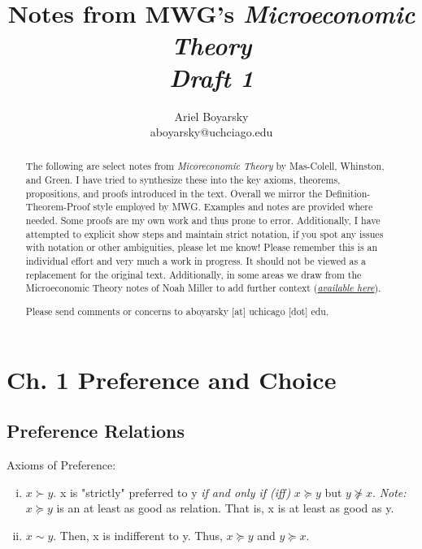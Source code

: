 \documentclass[12pt]{article}
\begin{document}
\title{Notes from MWG's \emph{Microeconomic Theory \\ Draft 1}} 
\author{Ariel Boyarsky\\ aboyarsky@uchciago.edu} 
\maketitle


\begin{abstract}
The following are select notes from \emph{Micoreconomic Theory} by Mas-Colell, Whinston, and Green. I have tried to synthesize these into the key axioms, theorems, propositions, and proofs introduced in the text. Overall we mirror the Definition-Theorem-Proof style employed by MWG. Examples and notes are provided where needed. Some proofs are my own work and thus prone to error. Additionally, I have attempted to explicit show steps and maintain strict notation, if you spot any issues with notation or other ambiguities, please let me know! Please remember this is an individual effort and very much a work in progress. It should not be viewed as a replacement for the original text. Additionally, in some areas we draw from the Microeconomic Theory notes of Noah Miller to add further context (\href{https://business.illinois.edu/nmiller/documents/notes/firsthalf.pdf}{\emph{available here}}).

Please send comments or concerns to aboyarsky [at] uchicago [dot] edu.
\end{abstract}
\section{Ch. 1 Preference and Choice}
\subsection{Preference Relations}
Axioms of Preference:
\begin{enumerate}[i.]
	\item $x \succ y$. x is "strictly" preferred to y \emph{if and only if (iff)} $x \succeq y$ but $y \not\succeq x$. 
	\emph{Note:} $x \succeq y$ is an at least as good as relation. That is, x is at least as good as y. 
	\item $x \sim y$. Then,  x is indifferent to y. Thus,  $x \succeq y$ and $y \succeq x$.
\end{enumerate}
\end{document}
